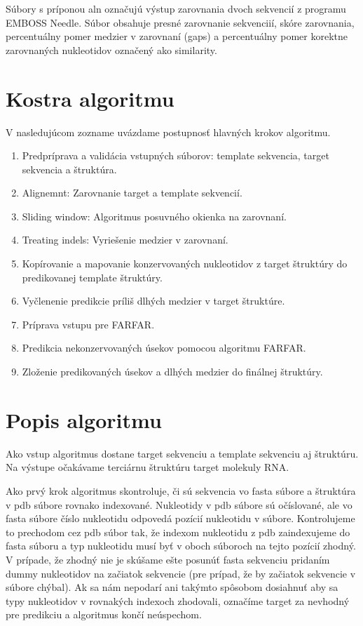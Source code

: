 \indent Súbory s príponou aln označujú výstup zarovnania dvoch sekvencií z programu EMBOSS Needle. Súbor obsahuje presné zarovnanie sekvenciií, skóre zarovnania, percentuálny pomer medzier v zarovnaní (gaps) a percentuálny pomer korektne zarovnaných nukleotidov označený ako similarity. 


\section{Kostra algoritmu}

V nasledujúcom zozname uvázdame postupnosť hlavných krokov algoritmu.\label{3-kostra}
\begin{enumerate}
\item Predpríprava a validácia vstupných súborov: template sekvencia, target sekvencia a štruktúra.
\item Alignemnt: Zarovnanie target a template sekvencií.
\item Sliding window: Algoritmus posuvného okienka na zarovnaní.
\item Treating indels: Vyriešenie medzier v zarovnaní.
\item Kopírovanie a mapovanie konzervovaných nukleotidov z target štruktúry do predikovanej template štruktúry. \label{3-map}
\item Vyčlenenie predikcie príliš dlhých medzier v target štruktúre.
\item Príprava vstupu pre FARFAR.
\item Predikcia nekonzervovaných úsekov pomocou algoritmu FARFAR.
\item Zloženie predikovaných úsekov a dlhých medzier do finálnej štruktúry.
\end{enumerate}

\section{Popis algoritmu}
Ako vstup algoritmus dostane target sekvenciu a template sekvenciu aj štruktúru. Na výstupe očakávame terciárnu štruktúru target molekuly RNA.


\indent  Ako prvý krok algoritmus skontroluje, či sú sekvencia vo fasta súbore a štruktúra v pdb súbore rovnako indexované. Nukleotidy v pdb súbore sú očíslované, ale vo fasta súbore číslo nukleotidu odpovedá pozícií nukleotidu v súbore. Kontrolujeme to prechodom cez pdb súbor tak, že indexom nukleotidu z pdb zaindexujeme do fasta súboru a typ nukleotidu musí byť v oboch súboroch na tejto pozícií zhodný. V prípade, že zhodný nie je skúšame ešte posunúť fasta sekvenciu pridaním dummy nukleotidov na začiatok sekvencie (pre prípad, že by začiatok sekvencie v súbore chýbal). Ak sa nám nepodarí ani takýmto spôsobom dosiahnuť aby sa typy nukleotidov v rovnakých indexoch zhodovali, označíme target za nevhodný pre predikciu a algoritmus končí neúspechom.


